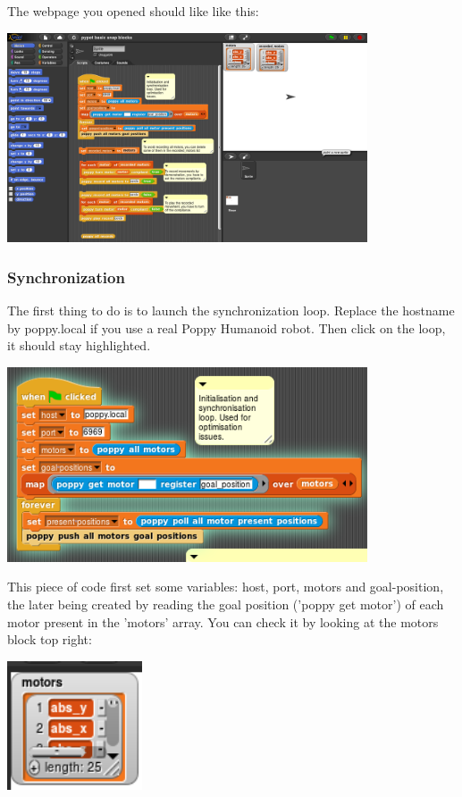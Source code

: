 \documentclass{article}
\begin{document}
The webpage you opened should like like this:

 \begin{center}
  \includegraphics[width=0.8\textwidth]{img/snap_full}
 \end{center}

\subsubsection{Synchronization}

The first thing to do is to launch the synchronization loop. Replace the hostname by poppy.local if you use a real Poppy Humanoid robot. Then click on the loop, it should stay highlighted.

 \begin{center}
  \includegraphics[width=0.8\textwidth]{img/snap_full_selected}
 \end{center}

This piece of code first set some variables: host, port, motors and goal-position, the later being created by reading the goal position  ('poppy get motor') of each motor present in the 'motors' array. You can check it by looking at the motors block top right:

 \begin{center}
  \includegraphics[width=0.3\textwidth]{img/snap_motors}
 \end{center}
\end{document}
